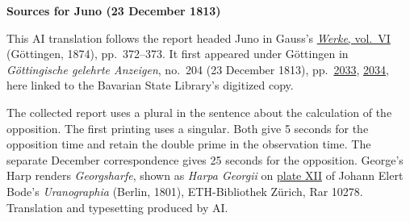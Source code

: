 \clearpage\thispagestyle{empty}
\begin{center}\textbf{Sources for Juno (23 December 1813)}\end{center}
\noindent This AI translation follows the report headed Juno in Gauss’s \href{https://gdz.sub.uni-goettingen.de/id/PPN236007467}{\textit{Werke}, vol.~VI} (Göttingen, 1874), pp.~372--373. It first appeared under Göttingen in \textit{Göttingische gelehrte Anzeigen}, no.~204 (23 December 1813), pp.~\href{https://api.digitale-sammlungen.de/iiif/image/v2/bsb10538684_01009/full/1600,/0/default.jpg}{2033}, \href{https://api.digitale-sammlungen.de/iiif/image/v2/bsb10538684_01010/full/1600,/0/default.jpg}{2034}, here linked to the Bavarian State Library’s digitized copy.
\par\smallskip\noindent The collected report uses a plural in the sentence about the calculation of the opposition. The first printing uses a singular. Both give 5 seconds for the opposition time and retain the double prime in the observation time. The separate December correspondence gives 25 seconds for the opposition. George’s Harp renders \textit{Georgsharfe}, shown as \textit{Harpa Georgii} on \href{https://www.e-rara.ch/i3f/v20/3341782/full/2200,/0/default.jpg}{plate XII} of Johann Elert Bode’s \textit{Uranographia} (Berlin, 1801), ETH-Bibliothek Zürich, Rar 10278. Translation and typesetting produced by AI.
\clearpage
